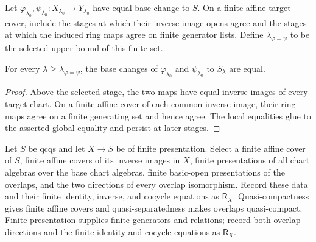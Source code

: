 \begin{definition}
  \label{def:nagata-morphism-equality-stage}

  Let $\varphi_{\lambda_0},\psi_{\lambda_0}\colon
  X_{\lambda_0}\to Y_{\lambda_0}$ have equal base change to $S$.  On a
  finite affine target cover, include the stages at which their inverse-image
  opens agree and the stages at which the induced ring maps agree on finite
  generator lists.  Define $\lambda_{\varphi=\psi}$ to be the selected upper
  bound of this finite set.
\end{definition}

\begin{lemma}
  \label{lemma:nagata-morphism-eq-eventually}

  For every $\lambda\geq\lambda_{\varphi=\psi}$, the base changes of
  $\varphi_{\lambda_0}$ and $\psi_{\lambda_0}$ to $S_\lambda$ are equal.
\end{lemma}

\begin{proof}
  Above the selected stage, the two maps have equal inverse images of every
  target chart.  On a finite affine cover of each common inverse image, their
  ring maps agree on a finite generating set and hence agree.  The local
  equalities glue to the asserted global equality and persist at later stages.
\end{proof}

\begin{definition}
  \label{def:nagata-relative-finite-affine-presentation}

  Let $S$ be qcqs and let $X\to S$ be of finite presentation.  Select a
  finite affine cover of
  $S$, finite affine covers of its inverse images in $X$, finite
  presentations of all chart algebras over the base chart algebras, finite
  basic-open presentations of the overlaps, and the two directions of every
  overlap isomorphism.  Record these data and their finite identity, inverse,
  and cocycle equations as $\mathsf R_X$.
  Quasi-compactness gives finite affine covers and quasi-separatedness makes
  overlaps quasi-compact. Finite presentation supplies finite generators and
  relations; record both overlap directions and the finite identity and
  cocycle equations as $\mathsf R_X$.
\end{definition}

